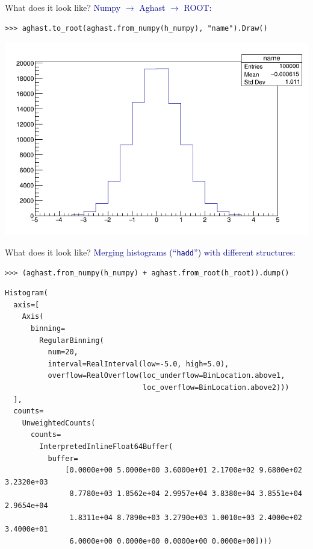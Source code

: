 \documentclass[aspectratio=169]{beamer}
\begin{document}
\begin{frame}[fragile]{What does it look like?}
\vspace{0.5 cm}
\small
\textcolor{darkblue}{\large Numpy $\to$ Aghast $\to$ ROOT:}
\begin{verbatim}
>>> aghast.to_root(aghast.from_numpy(h_numpy), "name").Draw()
\end{verbatim}

\begin{center}
\includegraphics[width=0.65\linewidth]{c1.png}
\end{center}
\end{frame}

\begin{frame}[fragile]{What does it look like?}
\vspace{0.25 cm}
\textcolor{darkblue}{Merging histograms (``{\tt\small hadd}'') with different structures:}

\small
\begin{verbatim}
>>> (aghast.from_numpy(h_numpy) + aghast.from_root(h_root)).dump()
\end{verbatim}

\scriptsize
\begin{verbatim}
Histogram(
  axis=[
    Axis(
      binning=
        RegularBinning(
          num=20,
          interval=RealInterval(low=-5.0, high=5.0),
          overflow=RealOverflow(loc_underflow=BinLocation.above1,
                                loc_overflow=BinLocation.above2)))
  ],
  counts=
    UnweightedCounts(
      counts=
        InterpretedInlineFloat64Buffer(
          buffer=
              [0.0000e+00 5.0000e+00 3.6000e+01 2.1700e+02 9.6800e+02 3.2320e+03
               8.7780e+03 1.8562e+04 2.9957e+04 3.8380e+04 3.8551e+04 2.9654e+04
               1.8311e+04 8.7890e+03 3.2790e+03 1.0010e+03 2.4000e+02 3.4000e+01
               6.0000e+00 0.0000e+00 0.0000e+00 0.0000e+00])))
\end{verbatim}
\end{frame}
\end{document}
